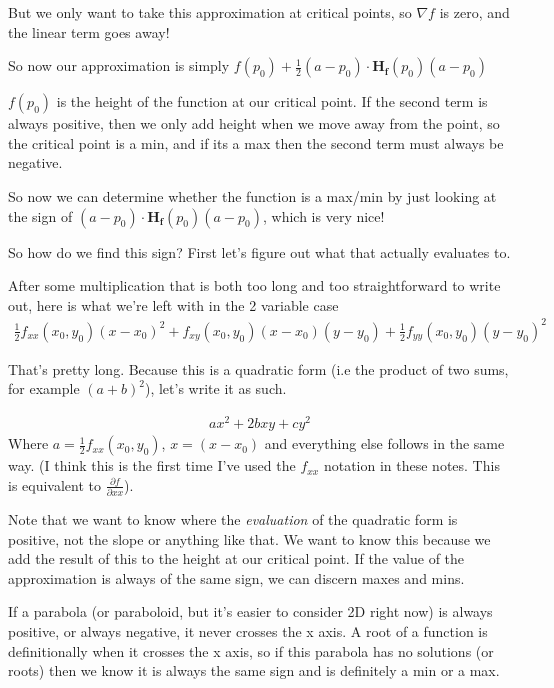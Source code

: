 \documentclass[12pt, letterpaper]{article}
\begin{document}
But we only want to take this approximation at critical points, so $\nabla f$ is zero, and the linear term goes away!

So now our approximation is simply $f(p_0) + \frac{1}{2}(a - p_0) \cdot \mathbf{H_f}(p_0)(a - p_0)$

$f(p_0)$ is the height of the function at our critical point. If the second term is always positive, then we only add height when we move away from the point, so the critical point is a min, and if its a max then the second term must always be negative.

So now we can determine whether the function is a max/min by just looking at the sign of $(a - p_0) \cdot \mathbf{H_f}(p_0)(a - p_0)$, which is very nice!

So how do we find this sign? First let's figure out what that actually evaluates to.

After some multiplication that is both too long and too straightforward to write out, here is what we're left with in the 2 variable case
\begin{gather*}
    \frac{1}{2}f_{xx}(x_0, y_0)(x - x_0)^2 + f_{xy}(x_0, y_0)(x - x_0)(y - y_0) + \frac{1}{2}f_{yy}(x_0, y_0)(y - y_0)^2
\end{gather*}

That's pretty long. Because this is a quadratic form (i.e the product of two sums, for example $(a+b)^2$), let's write it as such.

\begin{gather*}
    ax^2 + 2bxy + cy^2
\end{gather*}
Where $a = \frac{1}{2}f_{xx}(x_0, y_0)$, $x = (x - x_0)$ and everything else follows in the same way.
(I think this is the first time I've used the $f_{xx}$ notation in these notes. This is equivalent to $\frac{\partial f}{\partial xx}$).

Note that we want to know where the \textit{evaluation} of the quadratic form is positive, not the slope or anything like that. 
We want to know this because we add the result of this to the height at our critical point. 
If the value of the approximation is always of the same sign, we can discern maxes and mins.

If a parabola (or paraboloid, but it's easier to consider 2D right now) is always positive, or always negative, it never crosses the x axis. A root of a function is definitionally when it crosses the x axis, so if this parabola has no solutions (or roots) then we know it is always the same sign and is definitely a min or a max.
\end{document}
